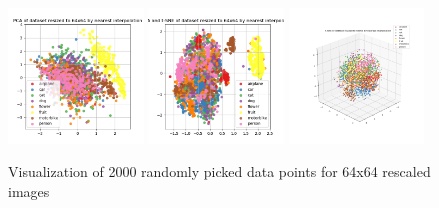 \documentclass{article}
\begin{document}
\begin{figure}[!htb]
	\begin{center}
	\includegraphics[width=0.32\textwidth]{./figures/pca_h64_w64_r_none.png}
	\includegraphics[width= 0.32\textwidth]{./figures/pca_tsne_h64_w64_r_none.png}
	\includegraphics[width= 0.32\textwidth]{./figures/tsne_h64_w64_r_none.png}
	\caption{Visualization of 2000 randomly picked data points for 64x64 rescaled images}
	\end{center}
\end{figure}
\end{document}
